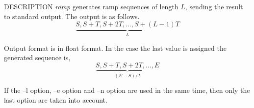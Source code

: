% 
% 
% 
% 
%                                                                        
%

\begin{synopsis}
\item[ramp] [ --l $L$ ] [ --n $N$ ] [ --s $S$ ] [ --e $E$ ] [ --t $T$ ]
\end{synopsis}

\begin{qsection}{DESCRIPTION}
{\em ramp} generates ramp sequences of length $L$, 
sending the result to standard output. 
The output is as follows.
\begin{displaymath}
\underbrace{S, S+T, S+2T,  \dots, S+(L-1)T}_{L}
\end{displaymath}
\par
Output format is in float format.
In the case the last value is assigned 
the generated sequence is,
\begin{displaymath}
\underbrace{S, S+T, S+2T,  \dots, E}_{(E-S)/T}
\end{displaymath}
\par
If the --l option, --e option and --n option are used
in the same time, then only the last option are taken into account.
\end{qsection}

